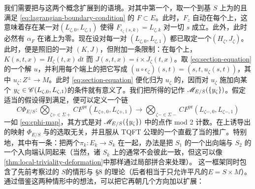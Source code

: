 我们需要把\trLagrange\trBoundaryCondition{}与\trRelative\trPerturbationDatum{}这两个概念扩展到\trStriplikeEnd{}的语境。对其中第一个，取一个\trProjection{}到基 $S$ 上为\trProper{}的且满足 \eqref{eq:lagrangian-boundary-condition} 的 $F\subset E$。此时，\trFamily{}$F_z$ 自动在每个\trStriplikeEnd{}上\trLocallyConstant，这意味着存在某一对\trLagrange\trSubmanifold{}$(L_{\zeta,0},L_{\zeta,1})$ 使得 $F_{\epsilon_\zeta(s,k)}=L_{\zeta,k}$ 对一切 $s$ 成立。此外，此时必然有 $\alpha_F$ 在诸\trStriplikeEnd{}上为零。现在设对每一对 $(L_{\zeta,0},L_{\zeta,1})$ 都已取定一个\trFloerDatum{}$(H_\zeta,J_\zeta)$。此时，\trRelative\trPerturbationDatum{}便是照旧的一对 $(K,J)$，但附加一条限制：在每个\trStriplikeEnd{}上，$K(s,t,x)=H_\zeta(t,x)\,dt$ 而 $J(s,t,x)=i\times J_\zeta(t,x)$。取 \eqref{eq:section-equation} 的一个解 $u$，并利用每个端上的\trTrivialization{}把它写成 $(u\circ\epsilon_\zeta)(s,t)=(s,t,u_\zeta(s,t))$，其中 $u_\zeta\colon Z^\pm\to M$。此时 \eqref{eq:section-equation} 便化归为 $u_\zeta$ 的\trFloerEquation，因而对 $u_\zeta$ 施加向某个 $y_\zeta\in\mathscr{C}(L_{\zeta,0},L_{\zeta,1})$\trAsymptotic\trConvergence{}的条件就有意义了。我们把所得的\trModuliSpace{}记作 $\mathscr{M}_{E/S}(\{y_\zeta\})$。假定适当的\trRegularity{}假设得到满足，便可以定义一个链\trHomomorphism
\begin{equation}\label{eq:cphi-fibration-map}
C\Phi_{E/S}\colon
\bigotimes_{\zeta+\in\Sigma+}CF^{\mathrm{pr}}(L_{\zeta+,0},L_{\zeta+,1})
\longrightarrow
\bigotimes_{\zeta-\in\Sigma-}CF^{\mathrm{pr}}(L_{\zeta-,0},L_{\zeta-,1})
\end{equation}
一如 \eqref{eq:cphi-map}，其方式是对 $\mathscr{M}_{E/S}(\{y_\zeta\})$ 中的\trIsolated{}点作 mod 2 计数。在\trFloerCohomology{}上诱导出的映射 $\Phi_{E/S}$ 与\trPerturbationDatum{}的选取无关，并且服从 TQFT 公理的一个直截了当的推广。特别地，其中有一条\trCompositionLaw：把两个\trLefschetz\trFibration{}$\pi_k\colon E_k\to S_k$ \trGluing{}在一起，办法是把 $S_1$ 的一个出向端与 $S_2$ 的一个入向端认同起来（当然，诸 $S_k$ 上的\trSymplecticStructure{}通常不会彼此一致，但这可以像\cref{thm:local-triviality-deformation}中那样通过局部拼合来处理）。
这一框架同时包含了先前考察过的 $S$\trCompact{}的情形与 §8 的理论（后者相当于只允许平凡的\trFibration{}$E=S\times M$）。
通过借鉴这两种情形中的想法，可以把它再朝几个方向加以扩展：
